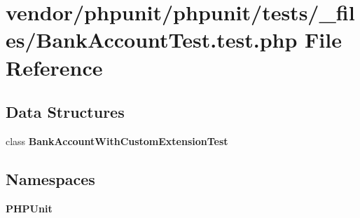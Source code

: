 \section{vendor/phpunit/phpunit/tests/\+\_\+files/\+Bank\+Account\+Test.test.\+php File Reference}
\label{_bank_account_test_8test_8php}
\subsection*{Data Structures}
\begin{DoxyCompactItemize}
\item 
class {\bf Bank\+Account\+With\+Custom\+Extension\+Test}
\end{DoxyCompactItemize}
\subsection*{Namespaces}
\begin{DoxyCompactItemize}
\item 
 {\bf P\+H\+P\+Unit}
\end{DoxyCompactItemize}
